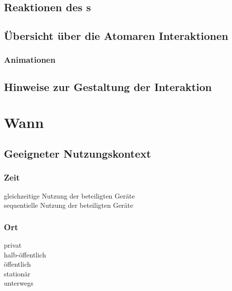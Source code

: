 	\subsection*{Reaktionen des \sendev s}
	\reactionSen
\fi


\subsection*{Übersicht über die Atomaren Interaktionen}
\microinteractionstabular

\subsubsection*{Animationen}
\animations

\subsection*{Hinweise zur Gestaltung der Interaktion}
\designnotes


\section*{Wann}

\subsection*{Geeigneter Nutzungskontext}
\validcontext

\subsubsection*{Zeit}
\checkbox{\simultaneously} gleichzeitige Nutzung der beteiligten Geräte \\
\checkbox{\sequentially} sequentielle Nutzung der beteiligten Geräte

\subsubsection*{Ort}
\checkbox{\private} privat \\
\checkbox{\semipublic} halb-öffentlich \\
\checkbox{\public} öffentlich \\
\checkbox{\stationary} stationär \\
\checkbox{\onthego} unterwegs 

